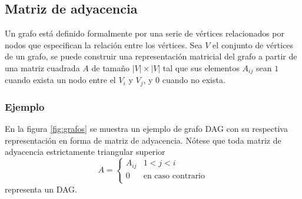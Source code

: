 \documentclass[10pt,a4paper]{article}
\begin{document}
\subsection{Matriz de adyacencia}
Un grafo está definido formalmente por una serie de vértices relacionados por nodos que especifican la relación entre los vértices. Sea $V$ el conjunto de vértices de un grafo, se puede construir una representación matricial del grafo a partir de una matriz cuadrada $A$ de tamaño $|V| \times |V|$ tal que sus elementos $A_{ij}$ sean $1$ cuando exista un nodo entre el $V_i$ y $V_j$, y $0$ cuando no exista.

\subsubsection*{Ejemplo}
En la figura \ref{fig:grafos} se muestra un ejemplo de grafo DAG con su respectiva representación en forma de matriz de adyacencia. Nótese que toda matriz de adyacencia estrictamente triangular superior
\[
A = \begin{cases} 
      A_{ij} & 1 < j < i \\
     0 & \text{en caso contrario} \\
    \end{cases}
\]
representa un DAG.
\end{document}
